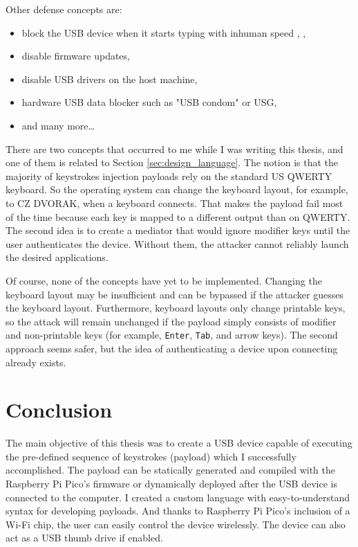 Other defense concepts are:
\begin{itemize}
    \item block the USB device when it starts typing with inhuman speed \cite{KerschbaumFlorian2018UBUK}, \cite{arghire_2020},
    \item disable firmware updates,
    \item disable USB drivers on the host machine,
    \item hardware USB data blocker such as "USB condom"\cite{al-sibai_2023} or USG\cite{doctorow_2017},
    \item and many more\dots
\end{itemize}
There are two concepts that occurred to me while I was writing this thesis, and one of them is related to Section \ref{sec:design_language}. The notion is that the majority of keystrokes injection payloads rely on the standard US QWERTY keyboard. So the operating system can change the keyboard layout, for example, to CZ DVORAK, when a keyboard connects. That makes the payload fail most of the time because each key is mapped to a different output than on QWERTY. The second idea is to create a mediator that would ignore modifier keys until the user authenticates the device. Without them, the attacker cannot reliably launch the desired applications.

Of course, none of the concepts have yet to be implemented. Changing the keyboard layout may be insufficient and can be bypassed if the attacker guesses the keyboard layout. Furthermore, keyboard layouts only change printable keys, so the attack will remain unchanged if the payload simply consists of modifier and non-printable keys (for example, \verb|Enter|, \verb|Tab|, and arrow keys). The second approach seems safer, but the idea of authenticating a device upon connecting already exists.


\chapter{Conclusion}
\label{ch:conclusion}

The main objective of this thesis was to create a USB device capable of executing the pre-defined sequence of keystrokes (payload) which I successfully accomplished. The payload can be statically generated and compiled with the Raspberry Pi Pico's firmware or dynamically deployed after the USB device is connected to the computer. I created a custom language with easy-to-understand syntax for developing payloads. And thanks to Raspberry Pi Pico's inclusion of a Wi-Fi chip, the user can easily control the device wirelessly. The device can also act as a USB thumb drive if enabled.

